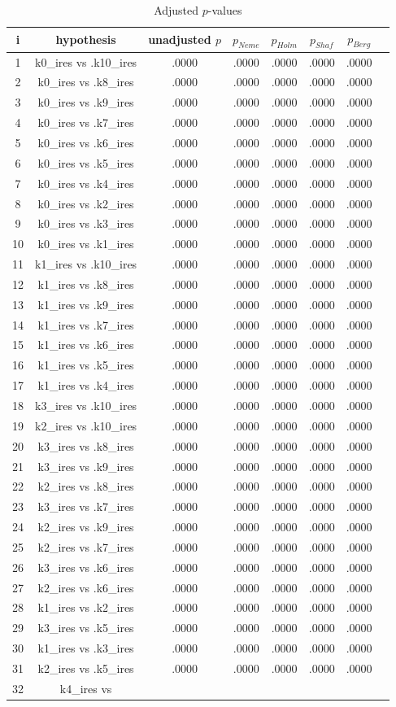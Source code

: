 \documentclass[a4paper,10pt]{article}
\begin{document}
\begin{landscape}
\begin{table}[!htp]
\centering\tiny
\caption{Adjusted $p$-values}
\begin{tabular}{cccccccc}
i&hypothesis&unadjusted $p$&$p_{Neme}$&$p_{Holm}$&$p_{Shaf}$&$p_{Berg}$\\
\hline
1&k0_ires vs .k10_ires&.0000&.0000&.0000&.0000&.0000\\2&k0_ires vs .k8_ires&.0000&.0000&.0000&.0000&.0000\\3&k0_ires vs .k9_ires&.0000&.0000&.0000&.0000&.0000\\4&k0_ires vs .k7_ires&.0000&.0000&.0000&.0000&.0000\\5&k0_ires vs .k6_ires&.0000&.0000&.0000&.0000&.0000\\6&k0_ires vs .k5_ires&.0000&.0000&.0000&.0000&.0000\\7&k0_ires vs .k4_ires&.0000&.0000&.0000&.0000&.0000\\8&k0_ires vs .k2_ires&.0000&.0000&.0000&.0000&.0000\\9&k0_ires vs .k3_ires&.0000&.0000&.0000&.0000&.0000\\10&k0_ires vs .k1_ires&.0000&.0000&.0000&.0000&.0000\\11&k1_ires vs .k10_ires&.0000&.0000&.0000&.0000&.0000\\12&k1_ires vs .k8_ires&.0000&.0000&.0000&.0000&.0000\\13&k1_ires vs .k9_ires&.0000&.0000&.0000&.0000&.0000\\14&k1_ires vs .k7_ires&.0000&.0000&.0000&.0000&.0000\\15&k1_ires vs .k6_ires&.0000&.0000&.0000&.0000&.0000\\16&k1_ires vs .k5_ires&.0000&.0000&.0000&.0000&.0000\\17&k1_ires vs .k4_ires&.0000&.0000&.0000&.0000&.0000\\18&k3_ires vs .k10_ires&.0000&.0000&.0000&.0000&.0000\\19&k2_ires vs .k10_ires&.0000&.0000&.0000&.0000&.0000\\20&k3_ires vs .k8_ires&.0000&.0000&.0000&.0000&.0000\\21&k3_ires vs .k9_ires&.0000&.0000&.0000&.0000&.0000\\22&k2_ires vs .k8_ires&.0000&.0000&.0000&.0000&.0000\\23&k3_ires vs .k7_ires&.0000&.0000&.0000&.0000&.0000\\24&k2_ires vs .k9_ires&.0000&.0000&.0000&.0000&.0000\\25&k2_ires vs .k7_ires&.0000&.0000&.0000&.0000&.0000\\26&k3_ires vs .k6_ires&.0000&.0000&.0000&.0000&.0000\\27&k2_ires vs .k6_ires&.0000&.0000&.0000&.0000&.0000\\28&k1_ires vs .k2_ires&.0000&.0000&.0000&.0000&.0000\\29&k3_ires vs .k5_ires&.0000&.0000&.0000&.0000&.0000\\30&k1_ires vs .k3_ires&.0000&.0000&.0000&.0000&.0000\\31&k2_ires vs .k5_ires&.0000&.0000&.0000&.0000&.0000\\32&k4_ires vs 
\end{tabular}
\end{table}
\end{landscape}
\end{document}
